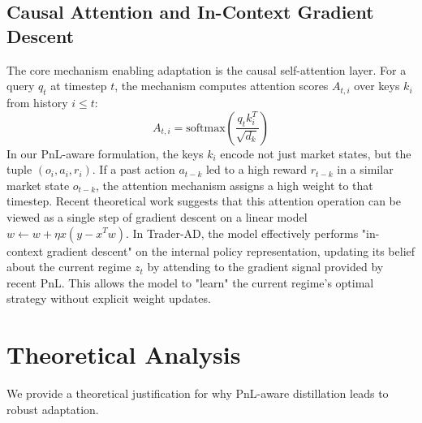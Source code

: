 \documentclass{article}
\begin{document}
\subsection{Causal Attention and In-Context Gradient Descent}
The core mechanism enabling adaptation is the causal self-attention layer. For a query $q_t$ at timestep $t$, the mechanism computes attention scores $A_{t, i}$ over keys $k_i$ from history $i \le t$:
\begin{equation}
    A_{t, i} = \text{softmax}\left( \frac{q_t k_i^T}{\sqrt{d_k}} \right)
\end{equation}
In our PnL-aware formulation, the keys $k_i$ encode not just market states, but the tuple $(o_i, a_i, r_i)$. If a past action $a_{t-k}$ led to a high reward $r_{t-k}$ in a similar market state $o_{t-k}$, the attention mechanism assigns a high weight to that timestep.
Recent theoretical work \citep{von2023transformers} suggests that this attention operation can be viewed as a single step of gradient descent on a linear model $w \leftarrow w + \eta x (y - x^T w)$. In Trader-AD, the model effectively performs "in-context gradient descent" on the internal policy representation, updating its belief about the current regime $z_t$ by attending to the gradient signal provided by recent PnL. This allows the model to "learn" the current regime's optimal strategy without explicit weight updates.

\section{Theoretical Analysis}
\label{sec:theory}
We provide a theoretical justification for why PnL-aware distillation leads to robust adaptation.
\end{document}
